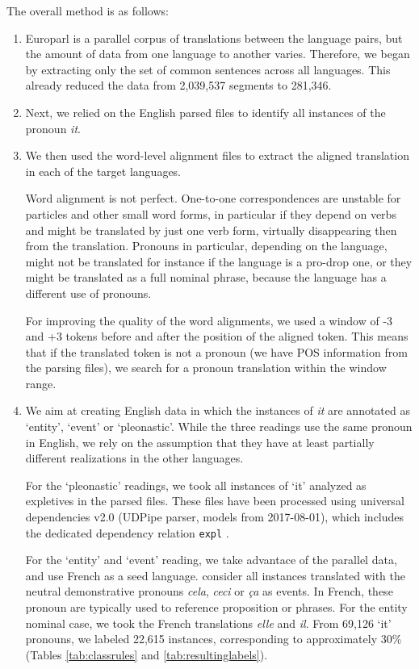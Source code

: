 \documentclass[10pt, a4paper]{article}
\begin{document}
The overall method is as follows:

\begin{enumerate}\setlength\itemsep{1em}

\item Europarl is a parallel corpus of translations
between the language pairs, but the amount of data from one language to another
varies. Therefore, we began by extracting only the set of common sentences
across all languages. This already reduced the data from 2,039,537 segments to
281,346. 

\item  Next, we relied on the English parsed files to
identify all instances of the pronoun \textit{it}.

\item We then used the word-level alignment files to
extract the aligned translation in each of the target languages.

Word alignment is not perfect. One-to-one correspondences are unstable for
particles and other small word forms, in particular if they depend on verbs and 
might be translated by just one verb form, virtually disappearing then from the
translation. Pronouns in particular, depending on the language, might not be
translated for instance if the language is a pro-drop one, or they might be
translated as a full nominal phrase, because the language has a different use of
pronouns.

For improving the quality of the word alignments, we used a window of -3 and
+3 tokens before and after the position of the aligned token. This means that if
the translated token is not a pronoun (we have POS information from the parsing
files), we search for a pronoun translation within the window range.

\item We aim at creating English data in which the instances of
\textit{it} are annotated as `entity', `event' or `pleonastic'. While the three
readings use the same pronoun in English, we rely on the assumption that they
have at least partially different realizations in the other languages.

For the `pleonastic' readings, we took all instances of `it' analyzed as 
expletives in the parsed files. These files have been processed using universal 
dependencies v2.0 (UDPipe parser, models from 2017-08-01), which includes the 
dedicated dependency relation \texttt{expl} \cite{bouma-etal-2018-expletives}.

For the `entity' and `event' reading, we take advantace of the parallel data, 
and use French as a seed language. 
consider all instances translated with the neutral demonstrative pronouns
\textit{cela}, \textit{ceci} or \textit{ça} as events. In French, these pronoun
are typically used to reference proposition or phrases. For the entity nominal
case, we took the French translations \textit{elle} and \textit{il}. From 69,126
`it' pronouns, we labeled 22,615 instances, corresponding to approximately 30\%
(Tables \ref{tab:classrules} and \ref{tab:resultinglabels}).


\end{enumerate}
\end{document}
